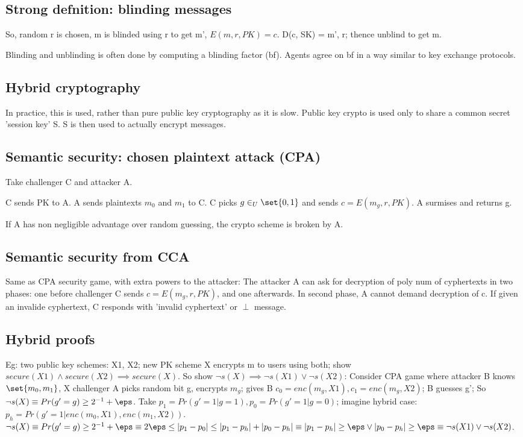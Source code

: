 \documentclass[oneside, article]{memoir}
\begin{document}
\subsection{Strong defnition: blinding messages}
So, random r is chosen, m is blinded using r to get m', $E(m, r, PK) = c$. D(c, SK) = m', r; thence unblind to get m.

Blinding and unblinding is often done by computing a blinding factor (bf). Agents agree on bf in a way similar to key exchange protocols.

\subsection{Hybrid cryptography}
In practice, this is used, rather than pure public key cryptography as it is slow. Public key crypto is used only to share a common secret 'session key' S. S is then used to actually encrypt messages.

\subsection{Semantic security: chosen plaintext attack (CPA)}
Take challenger C and attacker A.

C sends PK to A. A sends plaintexts $m_{0}$ and $m_{1}$ to C. C picks $g \in_{U} \set{0, 1}$ and sends $c = E(m_{g}, r, PK)$. A surmises and returns g.

If A has non negligible advantage over random guessing, the crypto scheme is broken by A.

\subsection{Semantic security from CCA}
Same as CPA security game, with extra powers to the attacker: The attacker A can ask for decryption of poly num of cyphertexts in two phases: one before challenger C sends $c = E(m_{g}, r, PK)$, and one afterwards. In second phase, A cannot demand decryption of c. If given an invalide cyphertext, C responds with 'invalid cyphertext' or $\perp$ message.

\subsection{Hybrid proofs}
Eg: two public key schemes: X1, X2; new PK scheme X encrypts m to users using both; show $secure(X1) \land secure(X2) \implies secure(X)$. So show $\lnot s(X) \implies \lnot s(X1) \lor \lnot s(X2)$: Consider CPA game where attacker B knows $\set{m_{0}, m_{1}}$, X challenger A picks random bit g, encrypts $m_{g}$; gives B $c_{0} = enc(m_{g}, X1), c_{1} = enc(m_{g}, X2)$; B guesses g'; So $\lnot s(X) \equiv Pr(g' = g) \geq 2^{-1} + \eps$. Take $p_{1} = Pr(g' = 1|g = 1), p_{0} = Pr(g' = 1|g = 0)$; imagine hybrid case: $p_{h} = Pr(g' = 1|enc(m_{0}, X1), enc(m_{1}, X2))$. $\lnot s(X) \equiv Pr(g' = g) \geq 2^{-1} + \eps \equiv 2 \eps \leq |p_{1} - p_{0}| \leq |p_{1} - p_{h}| + |p_{0} - p_{h}| \equiv |p_{1} - p_{h}| \geq \eps \lor |p_{0} - p_{h}| \geq \eps \equiv \lnot s(X1) \lor \lnot s(X2)$.
\end{document}
